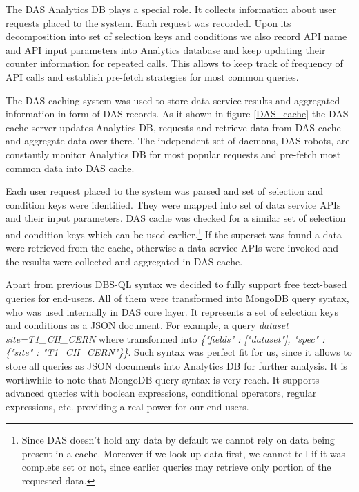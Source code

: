 \documentclass[a4paper]{jpconf}
\begin{document}
The DAS Analytics DB plays a special role. It collects information
about user requests placed to the system. Each request was recorded. Upon its
decomposition into set of selection keys and conditions we also record
API name and API input parameters into Analytics database and 
keep updating their counter information for repeated calls. 
This allows to keep track of frequency of API calls and establish 
pre-fetch strategies for most common queries.

The DAS caching system was used to store data-service results and aggregated
information in form of DAS records. As it shown in figure \ref{DAS_cache} 
the DAS cache server updates Analytics DB, requests and retrieve data from DAS cache
and aggregate data over there. The independent set of daemons, DAS robots, are
constantly monitor Analytics DB for most popular requests and pre-fetch most
common data into DAS cache.

Each user request placed to the system was parsed and set of selection
and condition keys were identified. They were mapped into set of
data service APIs and their input parameters. DAS
cache was checked for a similar set of selection and condition
keys which can be used earlier.\footnote{Since DAS doesn't hold
any data by default we cannot rely on data being present in a cache.
Moreover if we look-up data first, we cannot tell if it was complete
set or not, since earlier queries may retrieve only portion of the requested data.}
If the superset was found a data were
retrieved from the cache, otherwise a data-service APIs were
invoked and the results were collected and aggregated in DAS cache.


Apart from previous DBS-QL syntax we decided to fully support free text-based queries for end-users.
All of them were transformed into MongoDB query syntax, who was used internally in
DAS core layer. It represents a set of selection keys and conditions as a JSON document.
For example, a query
{\it dataset site=T1\_CH\_CERN}
where transformed into 
{\it \{"fields" : ["dataset"], "spec" : \{"site" : "T1\_CH\_CERN"\}\}}.
Such syntax was perfect fit for us, since it allows to store all queries
as JSON documents into Analytics DB for further analysis. It is worthwhile to note that
MongoDB query syntax is very reach. It supports advanced queries with 
boolean expressions, conditional operators, regular expressions, etc. providing
a real power for our end-users.
\end{document}
